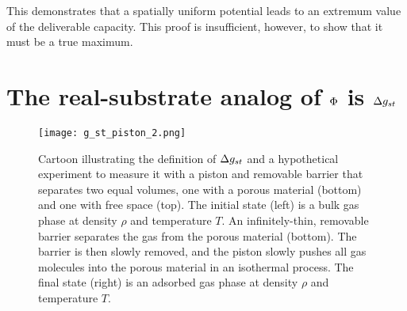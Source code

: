 This demonstrates that a spatially uniform potential leads to an extremum value
of the deliverable capacity. This proof is insufficient, however, to show that
it must be a true maximum.

\section{The real-substrate analog of $\Phi$ is $\Delta g_{st}$}
\label{sec:phi-is-delta-g}
\begin{figure}
    \centering
    \texttt{[image: g\_st\_piston\_2.png]}
    \caption{Cartoon illustrating the definition of $\Delta g_{st}$ and a
      hypothetical experiment to measure it with a piston and
      removable barrier that separates two equal volumes, one with a
      porous material (bottom) and one with free space (top). The
      initial state (left) is a bulk gas phase at density $\rho$ and
      temperature $T$. An infinitely-thin, removable barrier separates
      the gas from the porous material (bottom). The barrier is then
      slowly removed, and the piston slowly pushes all gas molecules
      into the porous material in an isothermal process. The final
      state (right) is an adsorbed gas phase at density $\rho$ and
      temperature $T$.}
    \label{fig:delta-G-cartoon}
\end{figure}

